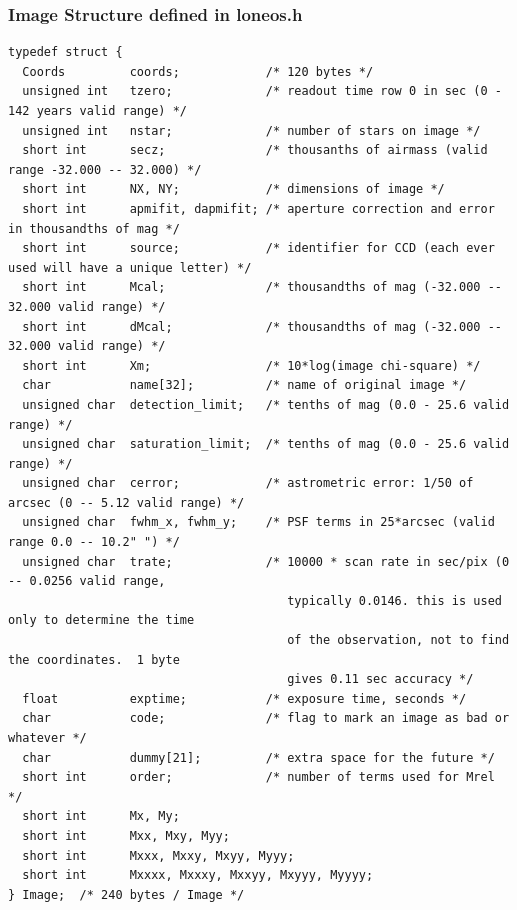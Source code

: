 \documentclass{article}
\begin{document}
\subsubsection*{Image Structure defined in loneos.h}
{\small
\begin{verbatim}
typedef struct {
  Coords         coords;            /* 120 bytes */
  unsigned int   tzero;             /* readout time row 0 in sec (0 - 142 years valid range) */
  unsigned int   nstar;             /* number of stars on image */
  short int      secz;              /* thousanths of airmass (valid range -32.000 -- 32.000) */
  short int      NX, NY;            /* dimensions of image */
  short int      apmifit, dapmifit; /* aperture correction and error in thousandths of mag */
  short int      source;            /* identifier for CCD (each ever used will have a unique letter) */
  short int      Mcal;              /* thousandths of mag (-32.000 -- 32.000 valid range) */
  short int      dMcal;             /* thousandths of mag (-32.000 -- 32.000 valid range) */
  short int      Xm;                /* 10*log(image chi-square) */
  char           name[32];          /* name of original image */
  unsigned char  detection_limit;   /* tenths of mag (0.0 - 25.6 valid range) */
  unsigned char  saturation_limit;  /* tenths of mag (0.0 - 25.6 valid range) */
  unsigned char  cerror;            /* astrometric error: 1/50 of arcsec (0 -- 5.12 valid range) */
  unsigned char  fwhm_x, fwhm_y;    /* PSF terms in 25*arcsec (valid range 0.0 -- 10.2" ") */
  unsigned char  trate;             /* 10000 * scan rate in sec/pix (0 -- 0.0256 valid range, 
                                       typically 0.0146. this is used only to determine the time
                                       of the observation, not to find the coordinates.  1 byte
                                       gives 0.11 sec accuracy */
  float          exptime;           /* exposure time, seconds */
  char           code;              /* flag to mark an image as bad or whatever */
  char           dummy[21];         /* extra space for the future */
  short int      order;             /* number of terms used for Mrel */
  short int      Mx, My;
  short int      Mxx, Mxy, Myy;
  short int      Mxxx, Mxxy, Mxyy, Myyy;
  short int      Mxxxx, Mxxxy, Mxxyy, Mxyyy, Myyyy;
} Image;  /* 240 bytes / Image */
\end{verbatim}}
\end{document}
